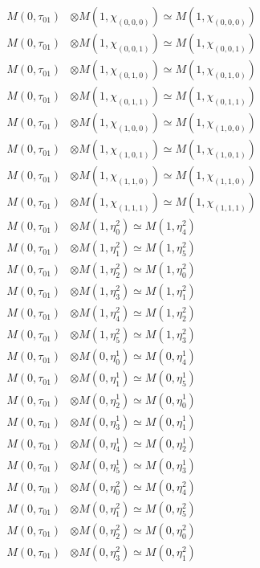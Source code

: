 \begin{align*}
M(0,\tau_{01}) &\otimes M(1,\chi_{(0,0,0)}) \simeq M(1,\chi_{(0,0,0)}) \\
M(0,\tau_{01}) &\otimes M(1,\chi_{(0,0,1)}) \simeq M(1,\chi_{(0,0,1)}) \\
M(0,\tau_{01}) &\otimes M(1,\chi_{(0,1,0)}) \simeq M(1,\chi_{(0,1,0)}) \\
M(0,\tau_{01}) &\otimes M(1,\chi_{(0,1,1)}) \simeq M(1,\chi_{(0,1,1)}) \\
M(0,\tau_{01}) &\otimes M(1,\chi_{(1,0,0)}) \simeq M(1,\chi_{(1,0,0)}) \\
M(0,\tau_{01}) &\otimes M(1,\chi_{(1,0,1)}) \simeq M(1,\chi_{(1,0,1)}) \\
M(0,\tau_{01}) &\otimes M(1,\chi_{(1,1,0)}) \simeq M(1,\chi_{(1,1,0)}) \\
M(0,\tau_{01}) &\otimes M(1,\chi_{(1,1,1)}) \simeq M(1,\chi_{(1,1,1)}) \\
M(0,\tau_{01}) &\otimes M(1,\eta^{2}_{0}) \simeq M(1,\eta^{2}_{4}) \\
M(0,\tau_{01}) &\otimes M(1,\eta^{2}_{1}) \simeq M(1,\eta^{2}_{5}) \\
M(0,\tau_{01}) &\otimes M(1,\eta^{2}_{2}) \simeq M(1,\eta^{2}_{0}) \\
M(0,\tau_{01}) &\otimes M(1,\eta^{2}_{3}) \simeq M(1,\eta^{2}_{1}) \\
M(0,\tau_{01}) &\otimes M(1,\eta^{2}_{4}) \simeq M(1,\eta^{2}_{2}) \\
M(0,\tau_{01}) &\otimes M(1,\eta^{2}_{5}) \simeq M(1,\eta^{2}_{3}) \\
M(0,\tau_{01}) &\otimes M(0,\eta^{1}_{0}) \simeq M(0,\eta^{1}_{4}) \\
M(0,\tau_{01}) &\otimes M(0,\eta^{1}_{1}) \simeq M(0,\eta^{1}_{5}) \\
M(0,\tau_{01}) &\otimes M(0,\eta^{1}_{2}) \simeq M(0,\eta^{1}_{0}) \\
M(0,\tau_{01}) &\otimes M(0,\eta^{1}_{3}) \simeq M(0,\eta^{1}_{1}) \\
M(0,\tau_{01}) &\otimes M(0,\eta^{1}_{4}) \simeq M(0,\eta^{1}_{2}) \\
M(0,\tau_{01}) &\otimes M(0,\eta^{1}_{5}) \simeq M(0,\eta^{1}_{3}) \\
M(0,\tau_{01}) &\otimes M(0,\eta^{2}_{0}) \simeq M(0,\eta^{2}_{4}) \\
M(0,\tau_{01}) &\otimes M(0,\eta^{2}_{1}) \simeq M(0,\eta^{2}_{5}) \\
M(0,\tau_{01}) &\otimes M(0,\eta^{2}_{2}) \simeq M(0,\eta^{2}_{0}) \\
M(0,\tau_{01}) &\otimes M(0,\eta^{2}_{3}) \simeq M(0,\eta^{2}_{1}) \\

\end{align*}

